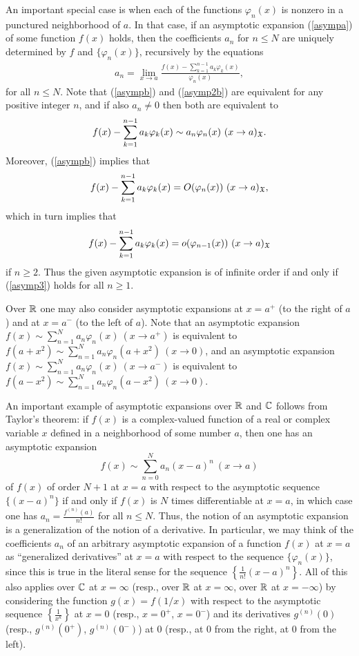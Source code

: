 \documentclass[12pt]{article}
\begin{document}
An important special case is when each of the functions $\varphi_n(x)$ is nonzero in a punctured neighborhood of $a$.   In that case, if an asymptotic expansion (\ref{asympa}) of some function $f(x)$ holds, then the  coefficients $a_n$ for $n \leq N$ are uniquely determined by $f$ and $\{\varphi_n(x)\}$, recursively by the equations
\begin{align}\label{asymp2b}
{\displaystyle a_{n}=\lim _{x\to a}{\frac {f(x)-\sum _{k=1}^{n-1}a_{k}\varphi _{k}(x)}{\varphi _{n}(x)}}},
\end{align}
for all $n \leq N$.  Note that (\ref{asympb}) and  (\ref{asymp2b}) are equivalent for any positive integer $n$, and if also $a_n \neq 0$ then both are equivalent to
$$f(x) - \sum _{k=1}^{n-1}a_{k}\varphi _{k}(x) \sim a_n \varphi_n(x) \ (x \to a)_{\mathfrak X}.$$
Moreover, (\ref{asympb}) implies that
\begin{align}\label{asymp3}
f(x) - \sum_{k=1}^{n-1} a_k \varphi_{k}(x) = O(\varphi_{n}(x)) \  (x \to a)_{\mathfrak X},
\end{align}
which in turn  implies that
\begin{align*}
f(x) - \sum_{k=1}^{n-1} a_k \varphi_{k}(x) = o(\varphi_{n-1}(x)) \  (x \to a)_{\mathfrak X}
\end{align*}
if $n \geq 2$.    Thus the given asymptotic expansion is of infinite order if and only if (\ref{asymp3}) holds for all $n \geq 1$.

Over ${\mathbb R}$ one may also consider asymptotic expansions at $x = a^+$ (to the right of $a$) and at $x = a^-$ (to the left of $a$).  Note that an asymptotic expansion $f(x) \sim \sum_{n = 1}^N a_n \varphi_n(x) \ (x \to a^+)$ is equivalent to $f(a+x^2) \sim \sum_{n = 1}^N a_n \varphi_n(a+ x^2) \ (x \to 0)$, and  an asymptotic expansion  $f(x) \sim \sum_{n = 1}^N a_n \varphi_n(x) \ (x \to a^-)$ is equivalent to $f(a-x^2) \sim \sum_{n = 1}^N a_n \varphi_n(a-x^2) \ (x \to 0)$.

An important example of asymptotic expansions over ${\mathbb R}$ and ${\mathbb C}$ follows from Taylor's theorem: if $f(x)$ is a complex-valued function of a real or complex variable $x$ defined in a neighborhood of some number $a$, then one has an asymptotic expansion 
 $$f(x) \sim \sum_{n = 0}^N a_n (x-a)^n \ (x \to a)$$
of $f(x)$ of order $N+1$ at $x = a$ with respect to the asymptotic sequence $\{(x-a)^n\}$ if and only if $f(x)$ is $N$ times differentiable at $x = a$, in which case  one has $a_n = \frac{f^{(n)}(a)}{n!}$ for all $n \leq N$.   Thus, the notion of an asymptotic expansion is a generalization of the notion of a derivative.  In particular,  we may think of the coefficients $a_n$ of an arbitrary asymptotic expansion of a function $f(x)$ at $x = a$ as  ``generalized derivatives'' at $x = a$ with respect to the sequence $\{\varphi_n(x)\}$, since this is true in the literal sense for the sequence $\left\{\frac{1}{n!}(x-a)^n\right\}$.  All of this also applies  over ${\mathbb C}$ at  $x = \infty$ (resp., over ${\mathbb R}$ at $x = \infty$, over ${\mathbb R}$ at $x = -\infty$) by considering the function $g(x) = f(1/x)$ with respect to the asymptotic sequence $\left\{ \frac{1}{x^k}\right\}$ at $x = 0$ (resp., $x = 0^+$, $x = 0^-$) and its derivatives $g^{(n)}(0)$  (resp., $g^{(n)}(0^+)$, $g^{(n)}(0^-)$) at $0$ (resp., at $0$ from the right, at $0$ from the left). 
\end{document}
